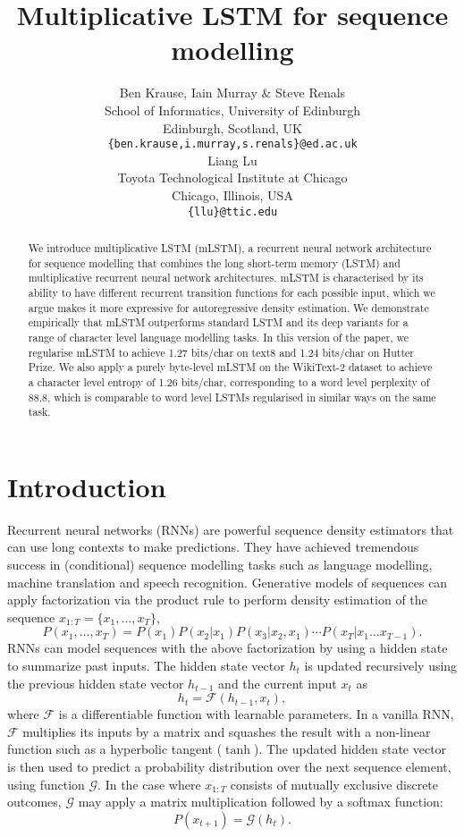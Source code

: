 \documentclass{article}
\title{Multiplicative LSTM for sequence modelling}
\author{Ben Krause, Iain Murray \& Steve Renals  \\
School of Informatics, University of Edinburgh\\
Edinburgh, Scotland, UK\\
\texttt{\{ben.krause,i.murray,s.renals\}@ed.ac.uk} \\
\And
Liang Lu \\
Toyota Technological Institute at Chicago \\
Chicago, Illinois, USA\\
\texttt{\{llu\}@ttic.edu} \\
}
\begin{document}
\maketitle

\begin{abstract}
We introduce multiplicative LSTM (mLSTM), a recurrent neural network architecture for sequence modelling that combines the long short-term memory (LSTM) and multiplicative recurrent neural network architectures. mLSTM is characterised by its ability to have different recurrent transition functions for each possible input, which we argue makes it more expressive for autoregressive density estimation. We demonstrate empirically that mLSTM outperforms standard LSTM and its deep variants for a range of character level language modelling tasks. In this version of the paper, we regularise mLSTM to achieve 1.27 bits/char on text8 and 1.24 bits/char on Hutter Prize. We also apply a purely byte-level mLSTM on the WikiText-2 dataset to achieve a character level entropy of 1.26 bits/char, corresponding to a word level perplexity of 88.8, which is comparable to word level LSTMs regularised in similar ways on the same task.
\end{abstract}
\section{Introduction}


Recurrent neural networks (RNNs) are powerful sequence density estimators that can use long contexts to make predictions.  They have achieved tremendous success in (conditional) sequence modelling tasks such as language modelling, machine translation and speech recognition.  Generative models of sequences can apply factorization via the product rule to perform density estimation of the sequence $x_{1:T} = \{x_1,\dots,x_T\}$,
\begin{equation}
P(x_1,\dots,x_T) = P(x_1) P(x_2|x_1)P(x_3|x_2,x_1)\cdots P(x_T|x_1\dots x_{T-1}).
\end{equation}
 RNNs can model sequences with the above factorization by using a hidden state to summarize past inputs. The hidden state vector $h_t$ is updated recursively using the previous hidden state vector $h_{t-1}$ and the current input $x_{t}$ as
\begin{equation}
h_t = \mathcal{F}(h_{t-1},x_t),
\end{equation}
where $\mathcal{F}$ is a differentiable function with learnable parameters. In a vanilla RNN, $\mathcal{F}$ multiplies its inputs by a matrix and squashes the result with a non-linear function such as a hyperbolic tangent ($\tanh$). The updated hidden state vector is then used to predict a probability distribution over the next sequence element, using function $\mathcal{G}$. In the case where $x_{1:T}$ consists of mutually exclusive discrete outcomes, $\mathcal{G}$ may apply a matrix multiplication followed by a softmax function:
\begin{equation}
P(x_{t+1}) = \mathcal{G}(h_t).
\end{equation}
\end{document}
